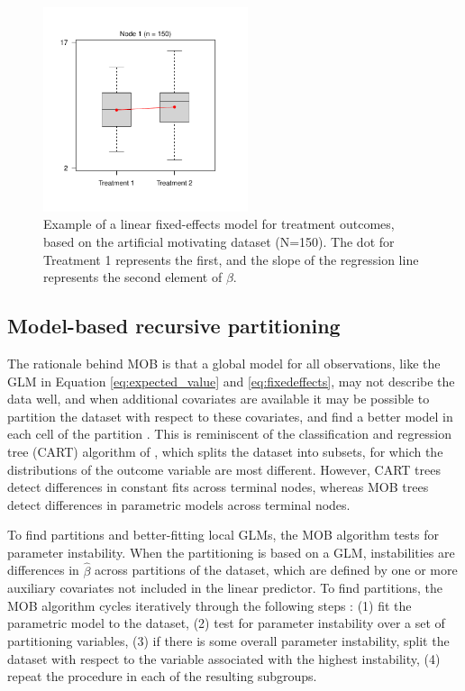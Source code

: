 \documentclass[nobf,doc]{apa}
\begin{document}
\vspace{20pt}
\begin{figure}[!htbp]
    \includegraphics[width=6cm]{glm_example.pdf}
	\caption{Example of a linear fixed-effects model for treatment outcomes, based on the artificial motivating dataset (N=150). The dot for Treatment 1 represents the first, and the slope of the regression line represents the second element of $\beta$.}
	\label{fig:fixedeffects}
\end{figure}


\subsection{Model-based recursive partitioning}

The rationale behind MOB is that a global model for all observations, like the GLM in Equation \ref{eq:expected_value} and \ref{eq:fixedeffects}, may not describe the data well, and when additional covariates are available it may be possible to partition the dataset with respect to these covariates, and find a better model in each cell of the partition \cite{ZeilyHoth08}. This is reminiscent of the classification and regression tree (CART) algorithm of , which splits the dataset into subsets, for which the distributions of the outcome variable are most different. However, CART trees detect differences in constant fits across terminal nodes, whereas MOB trees detect differences in parametric models across terminal nodes.

To find partitions and better-fitting local GLMs, the MOB algorithm tests for parameter instability. When the partitioning is based on a GLM, instabilities are differences in $\hat{\beta}$ across partitions of the dataset, which are defined by one or more auxiliary covariates not included in the linear predictor. To find partitions, the MOB algorithm cycles iteratively through the following steps \cite{ZeilyHoth08}: (1) fit the parametric model to the dataset, (2) test for parameter instability over a set of partitioning variables, (3) if there is some overall parameter instability, split the dataset with respect to the variable associated with the highest instability, (4) repeat the procedure in each of the resulting subgroups.
\end{document}
